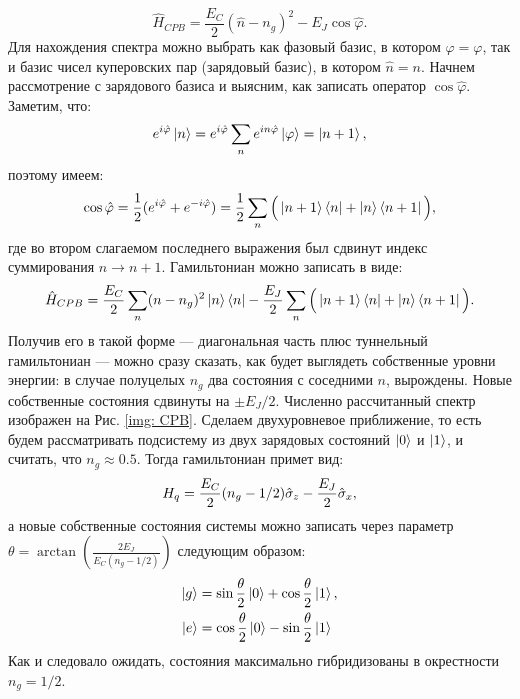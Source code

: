 \begin{equation}
\hat{H}_{CPB} = \frac{E_C}{2}(\hat{n}-n_g)^2-E_J \cos \hat{\varphi}.
\end{equation}
Для нахождения спектра можно выбрать как фазовый базис, в котором $\hat{\varphi}\!=\!\varphi$, так и базис чисел куперовских пар (зарядовый базис), в котором $\hat{n}\!=\!n$. Начнем рассмотрение с зарядового базиса и выясним, как записать оператор $\cos\hat{\varphi}$. Заметим, что:
\begin{equation}
e^{i\hat{\varphi}}\ket{n} = e^{i\hat{\varphi}}\sum_n e^{in\hat{\varphi}}\ket{\varphi} = \ket{n+1},
\end{equation}
поэтому имеем:
\begin{equation}\label{eq: cosphi}
\cos \hat{\varphi} = \frac{1}{2}(e^{i\hat{\varphi}}+e^{-i\hat{\varphi}}) =
\frac{1}{2}\sum_n\Big(\ket{n+1}\bra{n} + \ket{n}\bra{n+1}\Big),
\end{equation}
где во втором слагаемом последнего выражения был сдвинут индекс суммирования $n \rightarrow n+1$. Гамильтониан можно записать в виде:
\begin{equation}
\hat{H}_{CPB} = \frac{E_C}{2}\sum_n(n-n_g)^2\ket{n}\bra{n}-\frac{E_J}{2} \sum_n\Big(\ket{n+1}\bra{n} + \ket{n}\bra{n+1}\Big).
\end{equation}
Получив его в такой форме --- диагональная часть плюс туннельный гамильтониан --- можно сразу сказать, как будет выглядеть собственные уровни энергии: в случае полуцелых $n_g$ два состояния с соседними $n$, вырождены. Новые собственные состояния сдвинуты на $\pm E_J/2$. Численно рассчитанный спектр изображен на Рис. \ref{img: CPB}. Сделаем двухуровневое приближение, то есть будем рассматривать подсистему из двух зарядовых состояний $\ket{0}$ и $\ket{1}$, и считать, что $n_g \approx 0.5$. Тогда гамильтониан примет вид: 
\begin{equation}
H_q = \frac{E_C}{2}(n_g-1/2)\hat{\sigma}_z-\frac{E_J}{2}\hat{\sigma}_x, 
\end{equation}
а новые собственные состояния системы можно записать через параметр $\theta = \arctan(\frac{2E_J}{E_C(n_g-1/2)})$ следующим образом: 
\begin{equation}
\begin{aligned}
\ket{g} & = \sin \frac{\theta}{2} \ket{0} + \cos \frac{\theta}{2} \ket{1}, \\
\ket{e} & = \cos \frac{\theta}{2} \ket{0} - \sin \frac{\theta}{2} \ket{1}
\label{eq: charge_e}
\end{aligned}
\end{equation}
Как и следовало ожидать, состояния максимально гибридизованы в окрестности $n_g\!=\!1/2$. 

